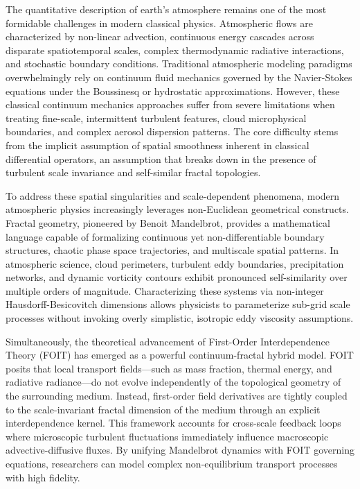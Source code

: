 \documentclass[11pt,a4paper]{article}
\begin{document}
The quantitative description of earth's atmosphere remains one of the most formidable challenges in modern classical physics. Atmospheric flows are characterized by non-linear advection, continuous energy cascades across disparate spatiotemporal scales, complex thermodynamic radiative interactions, and stochastic boundary conditions. Traditional atmospheric modeling paradigms overwhelmingly rely on continuum fluid mechanics governed by the Navier-Stokes equations under the Boussinesq or hydrostatic approximations. However, these classical continuum mechanics approaches suffer from severe limitations when treating fine-scale, intermittent turbulent features, cloud microphysical boundaries, and complex aerosol dispersion patterns. The core difficulty stems from the implicit assumption of spatial smoothness inherent in classical differential operators, an assumption that breaks down in the presence of turbulent scale invariance and self-similar fractal topologies.

To address these spatial singularities and scale-dependent phenomena, modern atmospheric physics increasingly leverages non-Euclidean geometrical constructs. Fractal geometry, pioneered by Benoit Mandelbrot, provides a mathematical language capable of formalizing continuous yet non-differentiable boundary structures, chaotic phase space trajectories, and multiscale spatial patterns. In atmospheric science, cloud perimeters, turbulent eddy boundaries, precipitation networks, and dynamic vorticity contours exhibit pronounced self-similarity over multiple orders of magnitude. Characterizing these systems via non-integer Hausdorff-Besicovitch dimensions allows physicists to parameterize sub-grid scale processes without invoking overly simplistic, isotropic eddy viscosity assumptions.

Simultaneously, the theoretical advancement of First-Order Interdependence Theory (FOIT) has emerged as a powerful continuum-fractal hybrid model. FOIT posits that local transport fields—such as mass fraction, thermal energy, and radiative radiance—do not evolve independently of the topological geometry of the surrounding medium. Instead, first-order field derivatives are tightly coupled to the scale-invariant fractal dimension of the medium through an explicit interdependence kernel. This framework accounts for cross-scale feedback loops where microscopic turbulent fluctuations immediately influence macroscopic advective-diffusive fluxes. By unifying Mandelbrot dynamics with FOIT governing equations, researchers can model complex non-equilibrium transport processes with high fidelity.
\end{document}
